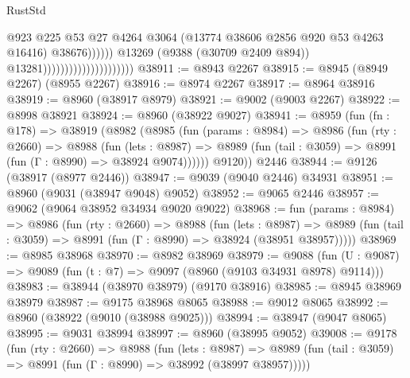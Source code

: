 \begin{lexlean}{RustStd}
\begin{coremodule}
                                                          @923
                                                          @225
                                                          @53
                                                          @27
                                                          @4264
                                                          @3064
                                                          (@13774
                                                            @38606
                                                            @2856
                                                            @920
                                                            @53
                                                            @4263
                                                            @16416)
                                                          @38676))))))
                                              @13269
                                              (@9388 (@30709 @2409 @894))
                                              @13281)))))))))))))))))))))
@38911 := @8943 @2267
@38915 := @8945 (@8949 @2267) (@8955 @2267)
@38916 := @8974 @2267
@38917 := @8964 @38916
@38919 := @8960 (@38917 @8979)
@38921 := @9002 (@9003 @2267)
@38922 := @8998 @38921
@38924 := @8960 (@38922 @9027)
@38941 := @8959
    (fun (fn : @178) =>
    @38919
      (@8982
        (@8985
          (fun (params : @8984) =>
          @8986
            (fun (rty : @2660) =>
            @8988
              (fun (lets : @8987) =>
              @8989 (fun (tail : @3059) => @8991 (fun (Γ : @8990) => @38924 @9074))))))
        @9120))
    @2446
@38944 := @9126 (@38917 (@8977 @2446))
@38947 := @9039 (@9040 @2446) @34931
@38951 := @8960 (@9031 (@38947 @9048) @9052)
@38952 := @9065 @2446
@38957 := @9062 (@9064 @38952 @34934 @9020 @9022)
@38968 := fun (params : @8984) =>
  @8986
    (fun (rty : @2660) =>
    @8988
      (fun (lets : @8987) =>
      @8989 (fun (tail : @3059) => @8991 (fun (Γ : @8990) => @38924 (@38951 @38957)))))
@38969 := @8985 @38968
@38970 := @8982 @38969
@38979 := @9088
    (fun (U : @9087) => @9089 (fun (t : @7) => @9097 (@8960 (@9103 @34931 @8978) @9114)))
@38983 := @38944 (@38970 @38979) (@9170 @38916)
@38985 := @8945 @38969 @38979
@38987 := @9175 @38968 @8065
@38988 := @9012 @8065
@38992 := @8960 (@38922 (@9010 (@38988 @9025)))
@38994 := @38947 (@9047 @8065)
@38995 := @9031 @38994
@38997 := @8960 (@38995 @9052)
@39008 := @9178
    (fun (rty : @2660) =>
    @8988
      (fun (lets : @8987) =>
      @8989 (fun (tail : @3059) => @8991 (fun (Γ : @8990) => @38992 (@38997 @38957)))))

\end{coremodule}
\end{lexlean}
